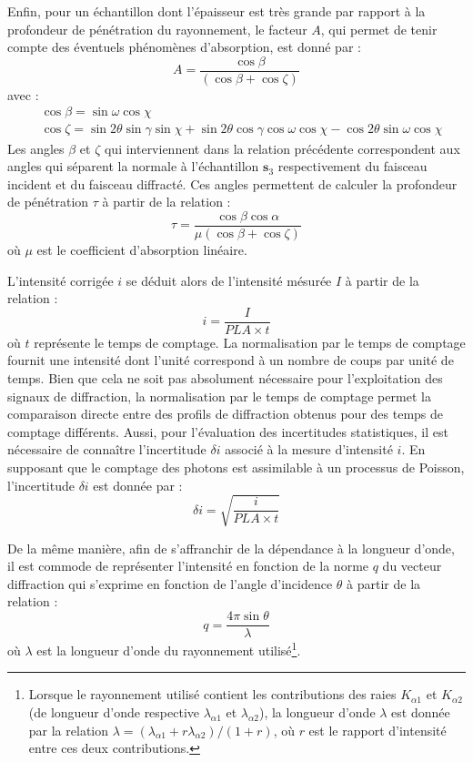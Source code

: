 \documentclass[french,a4paper]{report}
\begin{document}
Enfin, pour un échantillon dont l'épaisseur est très grande par rapport à la profondeur de pénétration du rayonnement, le facteur $A$, qui permet de tenir compte des éventuels phénomènes d'absorption, est donné par :
\begin{equation}
A = \frac{\cos \beta }{  \left(\cos \beta + \cos \zeta \right)} %
\end{equation}
avec :
\begin{align}
&\cos \beta = \sin \omega \cos \chi\\
&\cos \zeta = \sin 2 \theta \sin \gamma \sin \chi + \sin 2 \theta \cos \gamma \cos \omega \cos \chi -\cos 2 \theta \sin \omega \cos \chi
\end{align}
Les angles $\beta$ et $\zeta$ qui interviennent dans la relation précédente correspondent aux angles qui séparent la normale à l'échantillon $\boldsymbol s_3$ respectivement du faisceau incident et du faisceau diffracté. Ces angles permettent de calculer la profondeur de pénétration $\tau$ à partir de la relation :
\begin{equation}
\tau = \frac{\cos \beta \cos \alpha}{ \mu \left(\cos \beta + \cos \zeta \right)} %
\end{equation}
où $\mu$ est le coefficient d'absorption linéaire.

L'intensité corrigée $i$ se déduit alors de l'intensité mésurée $I$ à partir de la relation :
\begin{equation}
i = \frac{I}{PLA \times t}
\end{equation}
où $t$ représente le temps de comptage. La normalisation par le temps de comptage fournit une intensité dont l'unité correspond à un nombre de coups par unité de temps. Bien que cela ne soit pas absolument nécessaire pour l'exploitation des signaux de diffraction, la normalisation par le temps de comptage permet la comparaison directe entre des profils de diffraction obtenus pour des temps de comptage différents. Aussi, pour l'évaluation des incertitudes statistiques, il est nécessaire de connaître l'incertitude $\delta i$ associé à la mesure d'intensité $i$. En supposant que le comptage des photons est assimilable à un processus de Poisson, l'incertitude $\delta i$ est donnée par :
\begin{equation}
\delta i = \sqrt{\frac{i}{ PLA \times t}}
\end{equation}

De la même manière, afin de s'affranchir de la dépendance à la longueur d'onde, il est commode de représenter l'intensité en fonction de la norme $q$ du vecteur diffraction qui s'exprime en fonction de l'angle d'incidence $\theta$ à partir de la relation : 
\begin{equation}
q = \frac{4 \pi \sin \theta}{\lambda}
\end{equation}
où $\lambda$ est la longueur d'onde du rayonnement utilisé\footnote{Lorsque le rayonnement utilisé contient les contributions des raies $K_{\alpha 1}$ et $K_{\alpha 2}$ (de longueur d'onde respective $\lambda_{\alpha 1}$ et $\lambda_{\alpha 2}$), la longueur d'onde $\lambda$ est donnée par la relation $\lambda = (\lambda_{\alpha 1} + r \lambda_{\alpha 2})/(1+r)$, où $r$ est le rapport d'intensité entre ces deux contributions.}.
\end{document}
